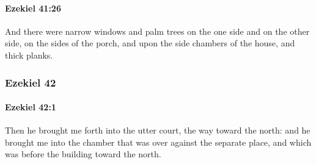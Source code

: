 		\paragraph{Ezekiel 41:26} %
			\label{EZEKIEL-41-26}

			And there were narrow windows and palm trees on the one side and on the other side, on the sides of the porch, and upon the side chambers of the house, and thick planks.

	\subsubsection{Ezekiel 42} %
		\label{EZEKIEL-42}

		\paragraph{Ezekiel 42:1} %
			\label{EZEKIEL-42-1}

			Then he brought me forth into the utter court, the way toward the north: and he brought me into the chamber that was over against the separate place, and which was before the building toward the north.

